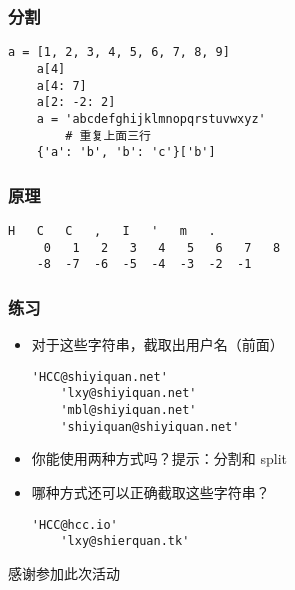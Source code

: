 \begin{frame} [fragile]
	\frametitle{分割}
	\linespread{1.5}
	\begin{lstlisting}[style=pythonstyle, gobble=4, texcl]
	a = [1, 2, 3, 4, 5, 6, 7, 8, 9]
	a[4]
	a[4: 7]
	a[2: -2: 2]
	a = 'abcdefghijklmnopqrstuvwxyz'
		# 重复上面三行
	{'a': 'b', 'b': 'c'}['b']
	\end{lstlisting}
\end{frame}

\begin{frame} [fragile]
	\frametitle{原理}
	\linespread{2}
	\begin{lstlisting}[basicstyle=\ttfamily,upquote=true,
						showstringspaces=false,tabsize=4,columns=fixed]
	   H   C   C   ,   I   '   m   .
	 0   1   2   3   4   5   6   7   8
	-8  -7  -6  -5  -4  -3  -2  -1
	\end{lstlisting}
\end{frame}

\begin{frame} [fragile]
	\frametitle{练习}
	\linespread{1.5}
	\begin{itemize}
	\item 对于这些字符串，截取出用户名（前面）
	\begin{lstlisting}[style=pythonstyle, gobble=4, texcl]
	'HCC@shiyiquan.net'
	'lxy@shiyiquan.net'
	'mbl@shiyiquan.net'
	'shiyiquan@shiyiquan.net'
	\end{lstlisting}
	\item 你能使用两种方式吗？提示：分割和 split
	\item 哪种方式还可以正确截取这些字符串？
	\begin{lstlisting}[style=pythonstyle, gobble=4, texcl]
	'HCC@hcc.io'
	'lxy@shierquan.tk'
	\end{lstlisting}
	\end{itemize}
\end{frame}


\PreLastFrame
\begin{frame}
	\centerline{\fontsize{32}{32}\selectfont 感谢参加此次活动}
\end{frame}

\newpage


